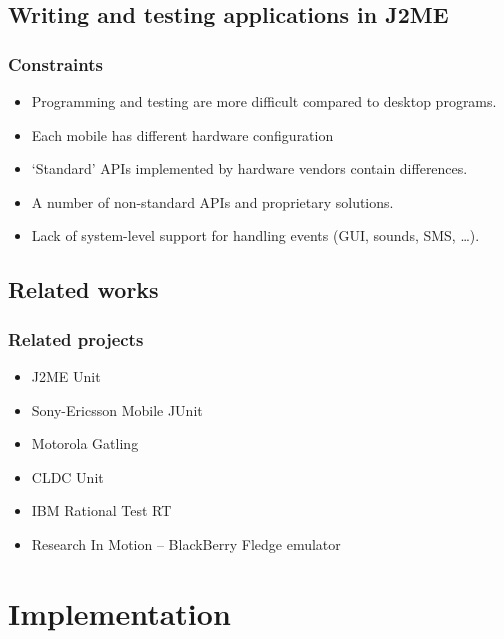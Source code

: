 \documentclass[compress]{beamer}
\begin{document}
\subsection[J2ME]{Writing and testing applications in J2ME} %

\begin{frame}
    \frametitle{Constraints}

	\begin{itemize}
        \item Programming and testing are more difficult compared to desktop programs.
        \item Each mobile has different hardware configuration
        \item `Standard' APIs implemented by hardware vendors contain differences.
        \item A number of non-standard APIs and proprietary solutions.
        \item Lack of system-level support for handling events (GUI, sounds, SMS, \ldots{}).
	\end{itemize}
\end{frame}

\subsection[Related]{Related works} %

\begin{frame}
    \frametitle{Related projects}

	\begin{itemize}
        \item J2ME Unit
        \item Sony-Ericsson Mobile JUnit
        \item Motorola Gatling
        \item CLDC Unit
        \item IBM Rational Test RT
        \item Research In Motion -- BlackBerry Fledge emulator
	\end{itemize}
\end{frame}


\section{Implementation} %
\end{document}
